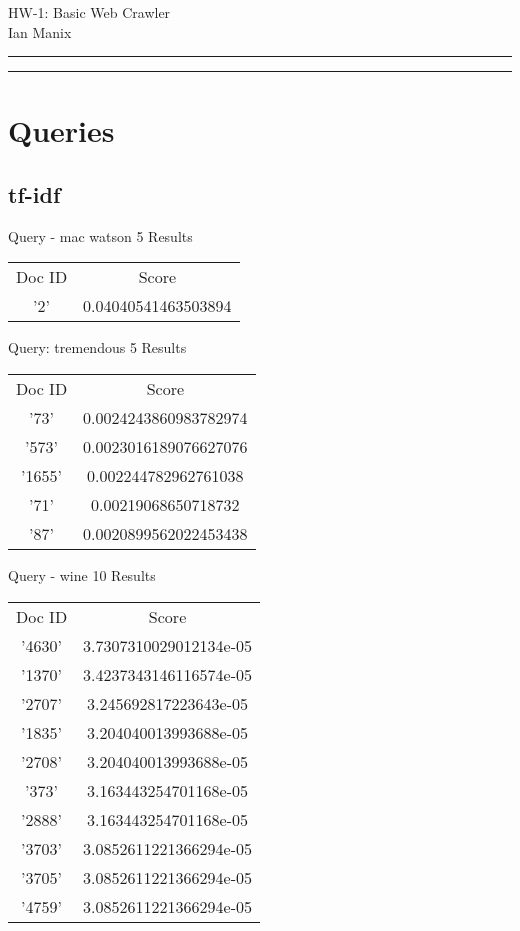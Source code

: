 \documentclass[12pt, letterpaper]{article}
\begin{document}
	\begin{center}
		\huge{HW-1: Basic Web Crawler}\\[10pt]
		\large{Ian Manix}
	\end{center}
\rule{\textwidth}{0.5pt}

\rule{\textwidth}{0.5pt}

\section{Queries}
\subsection{tf-idf}
\begin{center}
Query -  mac watson 5 \newline
Results 	\newline
\newline
\begin{tabular}{c|c}
	Doc ID & Score \\
	'2'& 0.04040541463503894 \\
\end{tabular}

Query: tremendous 5\newline
Results 	\newline
\newline
\begin{tabular}{c|c}
	Doc ID & Score \\
	'73'& 0.0024243860983782974 \\
	'573'& 0.0023016189076627076 \\
	'1655'& 0.002244782962761038 \\
	'71'& 0.00219068650718732 \\
	'87'& 0.0020899562022453438 \\
\end{tabular}

Query -  wine 10\newline
Results\newline
\newline
\begin{tabular}{c|c}
	Doc ID & Score \\
	'4630'& 3.7307310029012134e-05 \\
	'1370'& 3.4237343146116574e-05 \\
	'2707'& 3.245692817223643e-05 \\
	'1835'& 3.204040013993688e-05 \\
	'2708'& 3.204040013993688e-05 \\
	'373'& 3.163443254701168e-05 \\
	'2888'& 3.163443254701168e-05 \\
	'3703'& 3.0852611221366294e-05 \\
	'3705'& 3.0852611221366294e-05 \\
	'4759'& 3.0852611221366294e-05 \\
\end{tabular}


\end{center}
\end{document}
